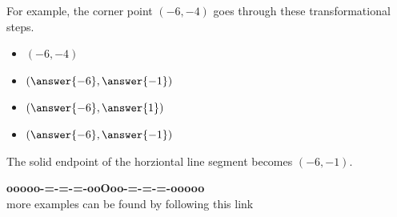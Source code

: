 \documentclass{ximera}
\begin{document}
\begin{procedure}
For example, the corner point $(-6, -4)$ goes through these transformational steps.

\begin{itemize}
\item $(-6, -4)$
\item $\left( \answer{-6},  \answer{-1} \right)$
\item $\left( \answer{-6},  \answer{1} \right)$
\item $\left( \answer{-6},  \answer{-1} \right)$
\end{itemize}

The solid endpoint of the horziontal line segment becomes $(-6, -1)$.
\end{procedure}












\begin{center}
\textbf{\textcolor{green!50!black}{ooooo-=-=-=-ooOoo-=-=-=-ooooo}} \\

more examples can be found by following this link\\ 

\end{center}
\end{document}
